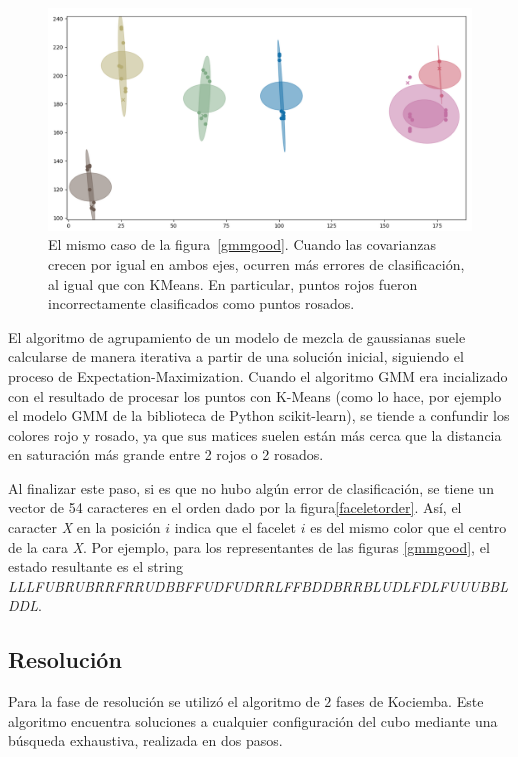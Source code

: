\begin{figure}[h!]
	\centering
	\includegraphics[width=\textwidth]{figures/gmm_bad}
	\caption[Gaussian Mixture Model con covarianzas circulares.]{El mismo caso de la figura~\ref{gmmgood}. Cuando las covarianzas crecen por igual en ambos ejes, ocurren más errores de clasificación, al igual que con KMeans. En particular, puntos rojos fueron incorrectamente clasificados como puntos rosados.}
	\label{gmmbad}
\end{figure}

El algoritmo de agrupamiento de un modelo de mezcla de gaussianas suele calcularse de manera iterativa a partir de una solución inicial, siguiendo el proceso de Expectation-Maximization. Cuando el algoritmo GMM era incializado con el resultado de procesar los puntos con K-Means (como lo hace, por ejemplo el modelo GMM de la biblioteca de Python scikit-learn), se tiende a confundir los colores rojo y rosado, ya que sus matices suelen están más cerca que la distancia en saturación más grande entre 2 rojos o 2 rosados.

Al finalizar este paso, si es que no hubo algún error de clasificación, se tiene un vector de 54 caracteres en el orden dado por la figura\ref{faceletorder}. Así, el caracter \textit{X} en la posición $i$ indica que el facelet $i$ es del mismo color que el centro de la cara \textit{X}. Por ejemplo, para los representantes de las figuras \ref{gmmgood}, el estado resultante es el string \textit{LLLFUBRUBRRFRRUDBBFFUDFUDRRLFFBDDBRRBLUDLFDLFUUUBBLDDL}.


\subsection{Resolución}
Para la fase de resolución se utilizó el algoritmo de $2$ fases de Kociemba.
Este algoritmo encuentra soluciones a cualquier configuración del cubo mediante una búsqueda exhaustiva, realizada en dos pasos.

